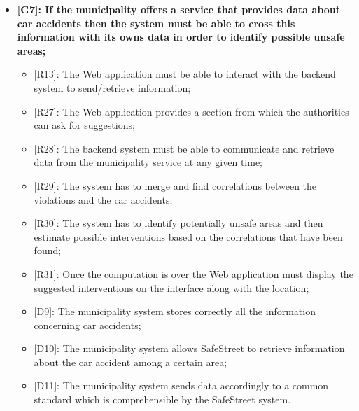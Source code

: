 \begin{itemize}
  \item \textbf{{[G7]}: If the municipality offers a service that provides data about car accidents then the system must be able to cross this information with its owns data in order to identify possible unsafe areas;}
    \begin{itemize}
      \item {[R13]}: The Web application must be able to interact with the backend system to send/retrieve information;
      \item {[R27]}: The Web application provides a section from which the authorities can ask for suggestions;
      \item {[R28]}: The backend system must be able to communicate and retrieve data from the municipality service at any given time;
      \item {[R29]}: The system has to merge and find correlations between the violations and the car accidents;
      \item {[R30]}: The system has to identify potentially unsafe areas and then estimate possible interventions based on the correlations that have been found;
      \item {[R31]}: Once the computation is over the Web application must display the suggested interventions on the interface along with the location;
      \item {[D9]}: The municipality system stores correctly all the information concerning car accidents;
      \item {[D10]}: The municipality system allows SafeStreet to retrieve information about the car accident among a certain area;
      \item {[D11]}: The municipality system sends data accordingly to a common standard which is comprehensible by the SafeStreet system. 
    \end{itemize}
\end{itemize}
